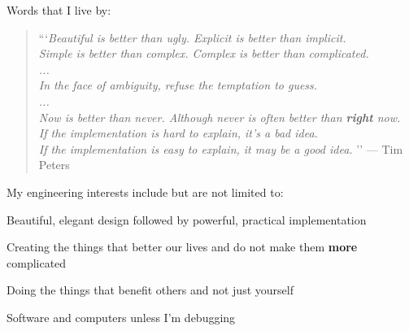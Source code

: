 
Words that I live by:
\begin{flushleft}
\begin{quote}
```\textit{Beautiful is better than ugly. Explicit is better than implicit.} \\
   \textit{Simple is better than complex. Complex is better than complicated.} \\
   \textit{...} \\
   \textit{In the face of ambiguity, refuse the temptation to guess.} \\
   \textit{...} \\
   \textit{Now is better than never.  Although never is often better than \textbf{right} now.} \\
   \textit{If the implementation is hard to explain, it's a bad idea.} \\
   \textit{If the implementation is easy to explain, it may be a good idea.}
'' — Tim Peters
\end{quote}
\end{flushleft}

My engineering interests include but are not limited to:
\newline
\begin{cvitems}
  \item Beautiful, elegant design followed by powerful, practical implementation
  \item Creating the things that better our lives and do not make them \textbf{more} complicated
  \item Doing the things that benefit others and not just yourself
  \item Software and computers unless I'm debugging
\end{cvitems}
